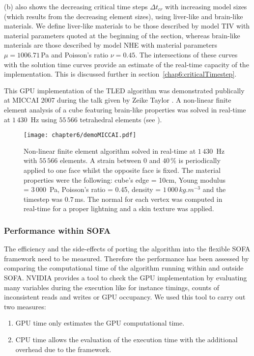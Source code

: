 (b) also shows the decreasing critical time steps $ \Delta t_{cr} $ with increasing model sizes (which results from the decreasing element sizes), using liver-like and brain-like materials. We define liver-like materials to be those described by model TIV with material parameters quoted at the beginning of the section, whereas brain-like materials are those described by model NHE with material parameters $\mu = 1006.71\, $Pa and Poisson's ratio $\nu = 0.45$. The intersections of these curves with the solution time curves provide an estimate of the real-time capacity of the implementation. This is discussed further in section~\ref{chap6:criticalTimestep}. 

\bigskip

\ON
This GPU implementation of the TLED algorithm was demonstrated publically at MICCAI 2007 during the talk given by Zeike Taylor \citep{Taylor07b}. A non-linear finite element analysis of a cube featuring brain-like properties was solved in real-time at $1\,430\,$ Hz using $55\,566$ tetrahedral elements (see ).
%
\begin{figure}[ht]
\begin{center}
\texttt{[image: chapter6/demoMICCAI.pdf]}
\end{center}
\caption[Real-time demo at MICCAI 2007]{Non-linear finite element algorithm solved in real-time at $1\,430\,$ Hz with $55\,566$ elements. A strain between 0 and $40\, \%$ is periodically applied to one face whilst the opposite face is fixed. The material properties were the following: cube's edge = 10cm, Young modulus = $3\,000\,$ Pa, Poisson's ratio = 0.45, density = $1\,000\, kg.m^{-3}$ and the timestep was $0.7\,$ms. The normal for each vertex was computed in real-time for a proper lightning and a skin texture was applied.} 
\label{chap6:fig-demoMICCAI}
\end{figure}
\OFF

	

		\subsubsection*{Performance within SOFA}
The efficiency and the side-effects of porting the algorithm into the flexible SOFA framework need to be measured. Therefore the performance has been assessed by comparing the computational time of the algorithm running within and outside SOFA. NVIDIA provides a tool to check the GPU implementation by evaluating many variables during the execution like for instance timings, counts of inconsistent reads and writes or GPU occupancy. We used this tool to carry out two measures:
\begin{enumerate}
\item GPU time only estimates the GPU computational time.
\item CPU time allows the evaluation of the execution time with the additional overhead due to the framework.
\end{enumerate}


